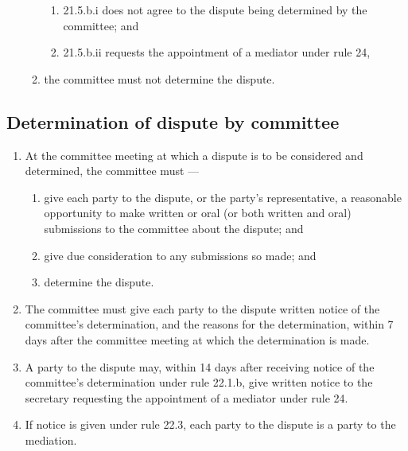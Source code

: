 \documentclass[../constitution.tex]{subfiles}
\begin{document}
\begin{enumerate}
\begin{enumerate}
    \begin{enumerate}
    
    \item 21.5.b.i does not agree to the dispute being determined by the committee; and
    \item 21.5.b.ii requests the appointment of a mediator under rule 24,
    \end{enumerate}
  \item the committee must not determine the dispute.
  \end{enumerate}
\end{enumerate}

\hypertarget{determination-of-dispute-by-committee}{%
\subsection{Determination of dispute by committee}\label{determination-of-dispute-by-committee}}

\begin{enumerate}

\item At the committee meeting at which a dispute is to be considered and determined, the committee must ---

  \begin{enumerate}
  
  \item give each party to the dispute, or the party's representative, a reasonable opportunity to make written or oral (or both written and oral) submissions to the committee about the dispute; and
  \item give due consideration to any submissions so made; and
  \item determine the dispute.
  \end{enumerate}
\item The committee must give each party to the dispute written notice of the committee's determination, and the reasons for the determination, within 7 days after the committee meeting at which the determination is made.
\item A party to the dispute may, within 14 days after receiving notice of the committee's determination under rule 22.1.b, give written notice to the secretary requesting the appointment of a mediator under rule 24.
\item If notice is given under rule 22.3, each party to the dispute is a party to the mediation.
\end{enumerate}
\end{document}
